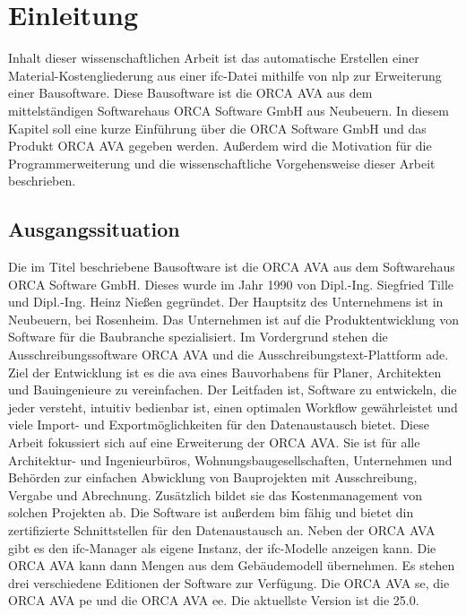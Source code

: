 \chapter{Einleitung}
\label{c:intro}

Inhalt dieser wissenschaftlichen Arbeit ist das automatische Erstellen einer Material-Kostengliederung aus einer \ac{ifc}-Datei mithilfe von \ac{nlp} zur Erweiterung einer Bausoftware. Diese Bausoftware ist die ORCA AVA aus dem mittelständigen Softwarehaus \glqq ORCA Software GmbH\grqq{} aus Neubeuern. 
In diesem Kapitel soll eine kurze Einführung über die \glqq ORCA Software GmbH\grqq{} und das Produkt  ORCA AVA gegeben werden. Außerdem wird die Motivation für die Programmerweiterung und die wissenschaftliche Vorgehensweise dieser Arbeit beschrieben.

\section{Ausgangssituation}
\label{c:intro:start}

Die im Titel beschriebene Bausoftware ist die ORCA AVA aus dem Softwarehaus \glqq ORCA Software GmbH\grqq{}. Dieses wurde im Jahr 1990 von Dipl.-Ing. Siegfried Tille und Dipl.-Ing. Heinz Nießen gegründet. Der Hauptsitz des Unternehmens ist in Neubeuern, bei Rosenheim. Das Unternehmen ist auf die Produktentwicklung von Software für die Baubranche spezialisiert. Im Vordergrund stehen die Ausschreibungssoftware ORCA AVA und die Ausschreibungstext-Plattform \ac{ade}. Ziel der Entwicklung ist es die \ac{ava} eines Bauvorhabens für Planer, Architekten und Bauingenieure zu vereinfachen. Der Leitfaden ist, Software zu entwickeln, die jeder versteht, intuitiv bedienbar ist, einen optimalen Workflow gewährleistet und viele Import- und Exportmöglichkeiten für den Datenaustausch bietet.
Diese Arbeit fokussiert sich auf eine Erweiterung der ORCA AVA. Sie ist für alle Architektur- und
Ingenieurbüros, Wohnungsbaugesellschaften, Unternehmen und Behörden zur einfachen Abwicklung von Bauprojekten mit Ausschreibung, Vergabe und Abrechnung. Zusätzlich bildet sie das Kostenmanagement von solchen Projekten ab. Die Software ist außerdem \ac{bim} fähig und bietet \ac{din} zertifizierte Schnittstellen für den Datenaustausch an. Neben der ORCA AVA gibt es den \ac{ifc}-Manager als eigene Instanz, der \ac{ifc}-Modelle anzeigen kann. Die ORCA AVA kann dann Mengen aus dem Gebäudemodell übernehmen.
Es stehen drei verschiedene Editionen der Software zur Verfügung. Die ORCA AVA \ac{se}, die ORCA AVA \ac{pe} und die ORCA AVA \ac{ee}. Die aktuellste Version ist die 25.0.

